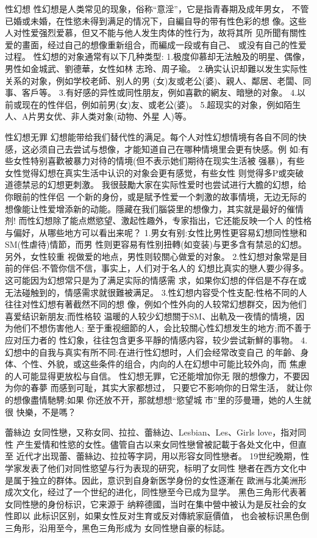 \documentclass[12pt,UTF8]{ctexbook}
\begin{document}
性幻想
性幻想是人类常见的现象，俗称“意淫”，它是指青春期及成年男女，
不管已婚或未婚，在性慾未得到满足的情况下，自編自导的带有性色彩的想
像。这些人对性爱强烈爱慕，但又不能与他人发生肉体的性行为，故将其所
见所聞有關性爱的畫面，经过自己的想像重新组合，而編成一段或有自己、
或没有自己的性爱过程。
性幻想的对象通常有以下几种类型:
1.极度仰慕却无法触及的明星、偶像，男性如金城武、劉德華，女性如林
志玲、周子瑜。
2.确实认识却難以发生实际性关系的对象，例如学校老師、别人的男
(女)友或老公(婆)、親人、鄰居、老闆、同事、客戶等。
3.有好感的异性或同性朋友，例如喜歡的網友、暗戀的对象。
4.以前或现在的性伴侣，例如前男(女)友、或老公(婆)。
5.超现实的对象，例如陌生人、A片男女优、非人类对象(动物、外星
人)等。

性幻想无罪
幻想能带给我们替代性的满足。每个人对性幻想情境有各自不同的快
感，这必须自己去尝试与想像，才能知道自己在哪种情境里会更有快感。例
如:有些女性特别喜歡被暴力对待的情境(但不表示她们期待在现实生活被
强暴)，有些女性觉得幻想在真实生活中认识的对象会更有感觉，有些女性
则觉得多P或突破道德禁忌的幻想更刺激。
我很鼓勵大家在实际性爱时也尝试进行大膽的幻想，给你眼前的性伴侣
一个新的身份，或是賦予性爱一个刺激的故事情境，无边无际的想像能让性爱增添新的动能。隱藏在我们腦袋里的想像力，其实就是最好的催情剂!
而性幻想除了能点燃慾望、激起性趣外，专家指出，它还能反映一个人
的性格与偏好，从哪些地方可以看出来呢？
1.男女有别:女性比男性更容易幻想同性戀和SM(性虐待)情節，而男
性则更容易有性别扭轉(如变装)与更多含有禁忌的幻想。另外，女性较重
视做爱的地点，男性则较關心做爱的对象。
2.性幻想对象常是目前的伴侣:不管你信不信，事实上，人们对于名人的
幻想比真实的戀人要少得多。这可能因为幻想常只是为了满足实际的情感需
求，如果你幻想的伴侣是不存在或无法碰触到的，情感需求就很難被满足。
3.性幻想内容受个性支配:性格不同的人往往对性幻想有著截然不同的想
像，例如个性外向的人较常幻想群交，因为他们喜爱结识新朋友;而性格较
温暖的人较少幻想關于SM、出軌及一夜情的情境，因为他们不想伤害他人;
至于重视细節的人，会比较關心性幻想发生的地方;而不善于应对压力者的
性幻象，往往包含更多平靜的情感内容，较少尝试新鮮的事物。
4.幻想中的自我与真实有所不同:在进行性幻想时，人们会经常改变自己
的年齡、身体、个性、外貌，或这些条件的组合，内向的人在幻想中可能比较外向，而
焦慮的人可能显得更放松与自信。
性幻想无罪，它还能增加你无
限的想像力，不要因为你的春夢
而感到可耻，其实大家都想过，
只要它不影响你的日常生活，
就让你的想像盡情馳騁;如果
你还放不开，那就想想“慾望城
市”里的莎曼珊，她的人生就很
快樂，不是嗎？

蕾絲边
女同性戀，又称女同、拉拉、蕾絲边、Lesbian、Les、Girls love，指对同性
产生爱情和性慾的女性。儘管自古以来女同性戀曾被記載于各处文化中，但直至
近代才出现蕾、蕾絲边、拉拉等字詞，用以形容女同性戀者。
19世纪晚期，性学家发表了他们对同性慾望与行为表现的研究，标明了女同性
戀者在西方文化中是属于独立的群体。因此，意识到自身新医学身份的女性逐漸在
歐洲与北美洲形成次文化，经过了一个世纪的进化，同性戀至今已成为显学。
黑色三角形代表著女同性戀的身份标识，它来源于
纳粹德國，当时在集中營中被认为是反社会的女性即以
此标识区别，如果女性反对生育或反对傳統家庭價值，
也会被标识黑色倒三角形，沿用至今，黑色三角形成为
女同性戀自豪的标誌。
\end{document}
